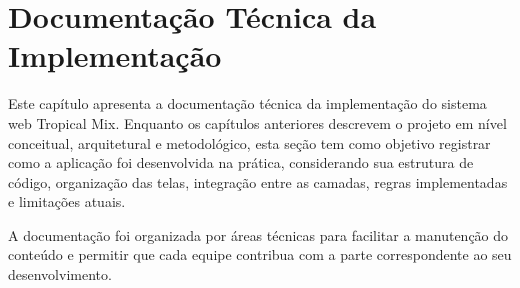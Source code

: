 \chapter{Documentação Técnica da Implementação}

Este capítulo apresenta a documentação técnica da implementação do sistema web Tropical Mix. 
Enquanto os capítulos anteriores descrevem o projeto em nível conceitual, arquitetural e metodológico, 
esta seção tem como objetivo registrar como a aplicação foi desenvolvida na prática, considerando sua 
estrutura de código, organização das telas, integração entre as camadas, regras implementadas e limitações atuais.

A documentação foi organizada por áreas técnicas para facilitar a manutenção do conteúdo e permitir que cada equipe contribua com a parte correspondente ao seu desenvolvimento.





